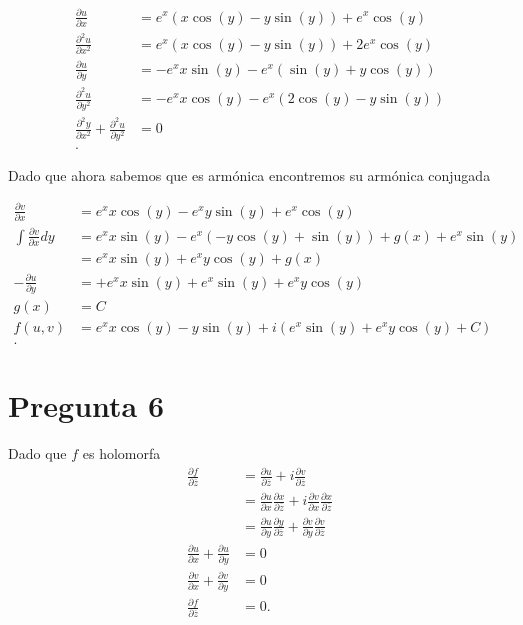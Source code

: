 \documentclass[12pt]{exam}
\begin{document}
\begin{align*}
  \frac{\partial u}{\partial x} &= e^{x}\left( x\cos\left( y \right) - y\sin\left( y \right)  \right) + e^{x}\cos\left( y \right)  \\
  \frac{\partial^2 u}{\partial x^2} &= e^{x}\left( x\cos\left( y \right) - y\sin\left( y \right)  \right) + 2e^{x}\cos\left( y \right)  \\
  \frac{\partial u}{\partial y}  &= -e^{x}x\sin\left( y \right) - e^{x}\left( \sin\left( y \right) + y\cos\left( y \right)  \right)  \\
  \frac{\partial^2 u}{\partial y^2} &= -e^{x}x\cos\left( y \right) -e^{x}\left( 2\cos\left( y \right) - y\sin\left( y \right)  \right)  \\
  \frac{\partial^2 y}{\partial x^2} + \frac{\partial^2 u}{\partial y^2}  &= 0 \\
.\end{align*}

Dado que ahora sabemos que es armónica encontremos su armónica conjugada

\begin{align*}
  \frac{\partial v}{\partial x} &= e^{x}x\cos\left( y \right) -e^{x}y\sin\left( y \right) + e^{x}\cos\left( y \right)  \\
  \int \frac{\partial v}{\partial x} dy &= e^{x}x\sin\left( y \right) - e^{x}\left( -y\cos\left( y \right) + \sin\left( y \right)  \right) + g\left( x \right) + e^{x}\sin\left( y \right) \\
  &=  e^{x}x\sin\left( y \right) + e^{x}y\cos\left( y \right) + g\left( x \right) \\
  - \frac{\partial u}{\partial y} &= + e^{x}x\sin\left( y \right) + e^{x}\sin\left( y \right) + e^{x}y\cos\left( y \right) \\
  g(x) &= C \\
  f(u,v) &= e^{x}x\cos\left( y \right) - y\sin\left( y \right) + i\left( e^{x}\sin\left( y \right) + e^{x}y\cos\left( y \right) + C \right)  \\
.\end{align*}

\section*{Pregunta 6}

Dado que $f$ es holomorfa
\begin{align*}
  \frac{\partial f}{\partial \overline{z}} &= \frac{\partial u}{\partial \overline{z}} +i \frac{\partial v}{\partial \overline{z}}  \\
  &= \frac{\partial u}{\partial x} \frac{\partial x}{\partial \overline{z}} +i \frac{\partial v}{\partial x} \frac{\partial x}{\partial \overline{z}}  \\
  &= \frac{\partial u}{\partial y} \frac{\partial y}{\partial \overline{z}} + \frac{\partial v}{\partial y} \frac{\partial v}{\partial \overline{z}}  \\
  \frac{\partial u}{\partial x} + \frac{\partial u}{\partial y} &= 0 \\
  \frac{\partial v}{\partial x} + \frac{\partial v}{\partial y} &= 0 \\
  \frac{\partial f}{\partial \overline{z}} &= 0 
.\end{align*}
\end{document}
